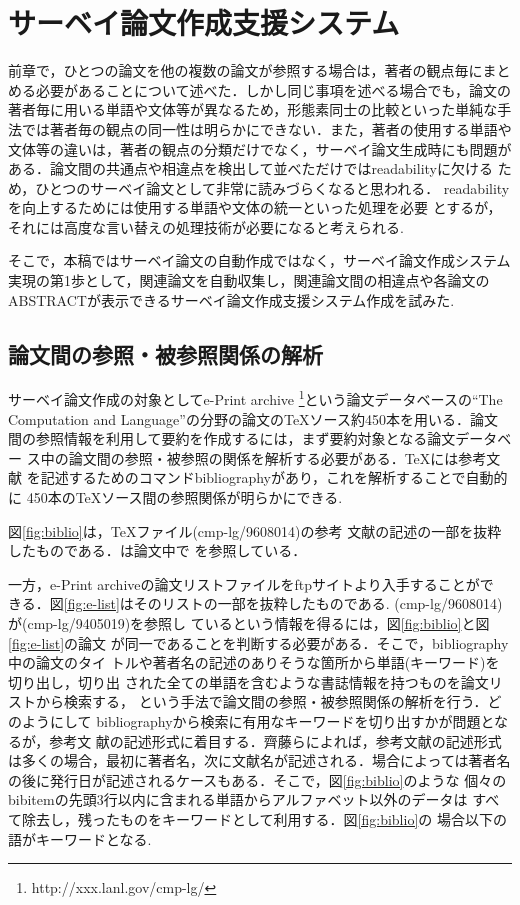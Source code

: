\normalsize

\section{サーベイ論文作成支援システム}

前章で，ひとつの論文を他の複数の論文が参照する場合は，著者の観点毎にまと
める必要があることについて述べた．しかし同じ事項を述べる場合でも，論文の
著者毎に用いる単語や文体等が異なるため，形態素同士の比較といった単純な手
法では著者毎の観点の同一性は明らかにできない．また，著者の使用する単語や
文体等の違いは，著者の観点の分類だけでなく，サーベイ論文生成時にも問題が
ある．論文間の共通点や相違点を検出して並べただけではreadabilityに欠ける
ため，ひとつのサーベイ論文として非常に読みづらくなると思われる．
readabilityを向上するためには使用する単語や文体の統一といった処理を必要
とするが，それには高度な言い替えの処理技術が必要になると考えられる.

そこで，本稿ではサーベイ論文の自動作成ではなく，サーベイ論文作成システム
実現の第1歩として，関連論文を自動収集し，関連論文間の相違点や各論文の
ABSTRACTが表示できるサーベイ論文作成支援システム作成を試みた.

\subsection{論文間の参照・被参照関係の解析}

サーベイ論文作成の対象としてe-Print archive
\footnote{http://xxx.lanl.gov/cmp-lg/}という論文データベースの``The
Computation and Language''の分野の論文の\TeX ソース約450本を用いる．論文
間の参照情報を利用して要約を作成するには，まず要約対象となる論文データベー
ス中の論文間の参照・被参照の関係を解析する必要がある．\TeX には参考文献
を記述するためのコマンドbibliographyがあり，これを解析することで自動的に
450本の\TeX ソース間の参照関係が明らかにできる.

図\ref{fig:biblio}は，\TeX ファイル\cite{Bond96a}(cmp-lg/9608014)の参考
文献の記述の一部を抜粋したものである．\cite{Bond96a}は論文中で
\cite{Murata93}を参照している．

一方，e-Print archiveの論文リストファイルをftpサイトより入手することがで
きる．図\ref{fig:e-list}はそのリストの一部を抜粋したものである.
\cite{Bond96a}(cmp-lg/9608014)が\cite{Murata93}(cmp-lg/9405019)を参照し
ているという情報を得るには，図\ref{fig:biblio}と図\ref{fig:e-list}の論文
が同一であることを判断する必要がある．そこで，bibliography中の論文のタイ
トルや著者名の記述のありそうな箇所から単語(キーワード)を切り出し，切り出
された全ての単語を含むような書誌情報を持つものを論文リストから検索する，
という手法で論文間の参照・被参照関係の解析を行う．どのようにして
bibliographyから検索に有用なキーワードを切り出すかが問題となるが，参考文
献の記述形式に着目する．齊藤ら\cite{齊藤93}によれば，参考文献の記述形式
は多くの場合，最初に著者名，次に文献名が記述される．場合によっては著者名
の後に発行日が記述されるケースもある．そこで，図\ref{fig:biblio}のような
個々のbibitemの先頭3行以内に含まれる単語からアルファベット以外のデータは
すべて除去し，残ったものをキーワードとして利用する．図\ref{fig:biblio}の
場合以下の語がキーワードとなる.

